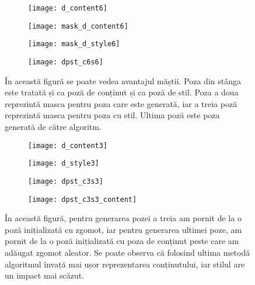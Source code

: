 \begin{figure}[h]
	\centering
    \begin{subfigure}[b]{0.24\textwidth}
		\centering
        \texttt{[image: d\_content6]}
        \label{fig:dpst_d_content6}
	\end{subfigure}
    \hfill
    \begin{subfigure}[b]{0.24\textwidth}
		\centering
        \texttt{[image: mask\_d\_content6]}
        \label{fig:dpst_d_mask_content6}
	\end{subfigure}
    \hfill
    \begin{subfigure}[b]{0.24\textwidth}
		\centering
        \texttt{[image: mask\_d\_style6]}
        \label{fig:dpst_d_mask_style6}
	\end{subfigure}
    \hfill
    \begin{subfigure}[b]{0.24\textwidth}
		\centering
        \texttt{[image: dpst\_c6s6]}
        \label{fig:dpst_c6s6}
	\end{subfigure}
    \caption{În această figură se poate vedea avantajul măștii. Poza din stânga este tratată și ca poză de conținut și ca poză de stil. Poza a doua reprezintă masca pentru poza care este generată, iar a treia poză reprezintă masca pentru poza cu stil. Ultima poză este poza generată de către algoritm.}
\end{figure}

\begin{figure}[h]
	\centering
    \begin{subfigure}[b]{0.24\textwidth}
		\centering
        \texttt{[image: d\_content3]}
        \label{fig:dpst_d_content3}
	\end{subfigure}
    \hfill
    \begin{subfigure}[b]{0.24\textwidth}
		\centering
        \texttt{[image: d\_style3]}
        \label{fig:dpst_d_style3}
	\end{subfigure}
    \hfill
    \begin{subfigure}[b]{0.24\textwidth}
		\centering
        \texttt{[image: dpst\_c3s3]}
        \label{fig:dpst_d_mask_style3}
	\end{subfigure}
    \hfill
    \begin{subfigure}[b]{0.24\textwidth}
		\centering
        \texttt{[image: dpst\_c3s3\_content]}
        \label{fig:dpst_c3s3_content}
	\end{subfigure}
    \caption{În această figură, pentru generarea pozei a treia am pornit de la o poză inițializată cu zgomot, iar pentru generarea ultimei poze, am pornit de la o poză inițializată cu poza de conținut peste care am adăugat zgomot aleator. Se poate observa că folosind ultima metodă algoritmul învață mai ușor reprezentarea conținutului, iar stilul are un impact mai scăzut.}
\end{figure}

